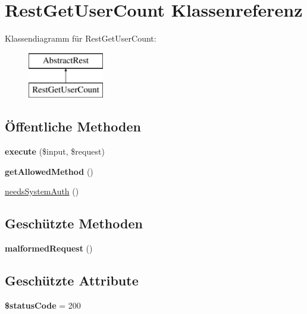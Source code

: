\hypertarget{class_rest_get_user_count}{}\section{Rest\+Get\+User\+Count Klassenreferenz}
\label{class_rest_get_user_count}
Klassendiagramm für Rest\+Get\+User\+Count\+:\begin{figure}[H]
\begin{center}
\leavevmode
\includegraphics[height=2.000000cm]{class_rest_get_user_count}
\end{center}
\end{figure}
\subsection*{Öffentliche Methoden}
\begin{DoxyCompactItemize}
\item 
\mbox{\label{class_rest_get_user_count_a4915b426180e82299b1812d597f4ee26}} 
{\bfseries execute} (\$input, \$request)
\item 
\mbox{\label{class_rest_get_user_count_a30120696b14facbe5fbb0ac5f0069921}} 
{\bfseries get\+Allowed\+Method} ()
\item 
\mbox{\hyperlink{class_rest_get_user_count_a69097d731d433ad6d12fd9a7a814389d}{needs\+System\+Auth}} ()
\end{DoxyCompactItemize}
\subsection*{Geschützte Methoden}
\begin{DoxyCompactItemize}
\item 
\mbox{\label{class_rest_get_user_count_a2bcb59e18bf13a4e0a7e74cc59afd026}} 
{\bfseries malformed\+Request} ()
\end{DoxyCompactItemize}
\subsection*{Geschützte Attribute}
\begin{DoxyCompactItemize}
\item 
\mbox{\label{class_rest_get_user_count_a882c2d49aae03cad76f70bd763341c1a}} 
{\bfseries \$status\+Code} = 200
\end{DoxyCompactItemize}


